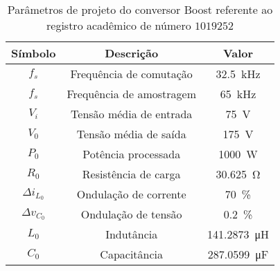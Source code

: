 \begin{table}[!ht]
\centering
\caption{Parâmetros de projeto do conversor Boost referente ao registro acadêmico de número $1019252$}
\label{tab:parametros}
\begin{tabular}{@{}ccc@{}}
\toprule
\textbf{Símbolo} & \textbf{Descrição} & \textbf{Valor}\\ \midrule
$f_s$ & Frequência de comutação & \SI{32.5}{\kilo\hertz}\\
$f_s$ & Frequência de amostragem & \SI{65}{\kilo\hertz}\\
$V_i$ & Tensão média de entrada  & \SI{75}{\V}\\
$V_0$ & Tensão média de saída  & \SI{175}{\V} \\
$P_0$ & Potência processada  & \SI{1000}{\W} \\
$R_0$ & Resistência de carga & \SI{30.625}{\ohm} \\
$\Delta{i_{L_0}}$  & Ondulação de corrente & \SI{70}{\%}\\
$\Delta{v_{C_0}}$  & Ondulação de tensão & \SI{0.2}{\%}\\
$L_0$ & Indutância & \SI{141.2873}{\micro\henry}\\
$C_0$ & Capacitância & \SI{287.0599}{\micro\farad}\\
\bottomrule
\end{tabular}
\end{table}

